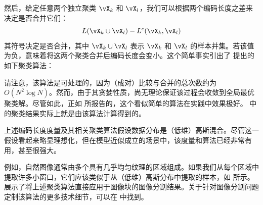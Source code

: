 \documentclass[../../book-main_zh.tex]{subfiles}
\begin{document}
然后，给定任意两个独立聚类 $\vX_k$ 和 $\vX_l$，我们可以根据两个编码长度之差来决定是否合并它们：
\begin{equation}
    L(\vX_k \cup \vX_l) - L^c(\vX_k, \vX_l)
\end{equation}
其符号决定是否合并，其中 $\vX_k \cup \vX_l$ 表示 $\vX_k$ 和 $\vX_l$ 的样本并集。若该值为负，意味着将这两个聚类合并后编码长度会变小。这个简单事实引出了 \cite{ma2007segmentation} 提出的如下聚类算法：
\begin{algorithm}[!htbp]
    \caption{编码长度的成对最速下降法}\label{alg:steepest_descent_coding_length}
    \begin{algorithmic}[1]

         
        \State{\Return{\(\cC\)}} 
        \Else
         
         
        \EndIf
        \EndWhile
        \State{\Return{\(\cC\)}}  
        \EndProcedure
    \end{algorithmic}
\end{algorithm}

请注意，该算法是可处理的，因为（成对）比较与合并的总次数约为 $O(N^2\log N)$。然而，由于其贪婪性质，尚无理论保证该过程会收敛到全局最优聚类解。尽管如此，正如 \cite{ma2007segmentation} 所报告的，这个看似简单的算法在实践中效果极好。 中的聚类结果实际上就是由该算法计算得到的。

\begin{example}[图像分割]\label{eg:image-segmentation} 上述编码长度度量及其相关聚类算法假设数据分布是（低维）高斯混合。尽管这一假设看起来略显理想化，但在模型近似成立的场景中，该度量和算法已经非常有用，甚至很强大。

    例如，自然图像通常由多个具有几乎均匀纹理的区域组成。如果我们从每个区域中提取许多小窗口，它们应该类似于从（低维）高斯分布中提取的样本，如  所示。 展示了将上述聚类算法直接应用于图像块的图像分割结果。关于针对图像分割问题定制该算法的更多技术细节，可以在 \cite{Mobahi-IJCV2011} 中找到。
\end{example}
\end{document}
